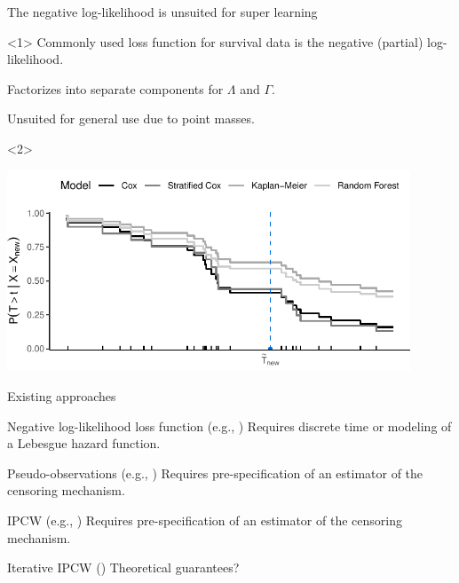 \documentclass[smaller]{beamer}\usepackage{listings}
\begin{document}
\begin{frame}[label={sec:orgfde87cd}]{The negative log-likelihood is unsuited for super learning}
\begin{onlyenv}<1>
Commonly used loss function for survival data is the negative (partial)
log-likelihood.

\vfill

Factorizes into separate components for \(\Lambda\) and \(\Gamma\).

\vfill

Unsuited for general use due to point masses.
\end{onlyenv}


\begin{onlyenv}<2>
\begin{center}
\includegraphics[width=0.9\textwidth]{./sl-hold-out-sample.pdf}
\end{center}
\end{onlyenv}
\end{frame}


\begin{frame}[label={sec:orgf238532}]{Existing approaches}
\small
\begin{block}{\normalsize Negative log-likelihood loss function \footnotesize (e.g., \cite{polley2011-sl-cens})}
Requires discrete time or modeling of a Lebesgue hazard function.

\hfill
\end{block}

\begin{block}{\normalsize Pseudo-observations \footnotesize (e.g., \cite{sachs2019ensemble})}
Requires pre-specification of an estimator of the censoring mechanism.

\hfill
\end{block}

\begin{block}{\normalsize IPCW \footnotesize (e.g., \cite{graf1999assessment,hothorn2006survival,gerds2006consistent,gonzalez2021stacked})}
Requires pre-specification of an estimator of the censoring mechanism.

\hfill
\end{block}

\begin{block}{\normalsize Iterative IPCW \footnotesize (\cite{westling2021inference,han2021inverse})}
Theoretical guarantees?
\end{block}
\end{frame}
\end{document}
